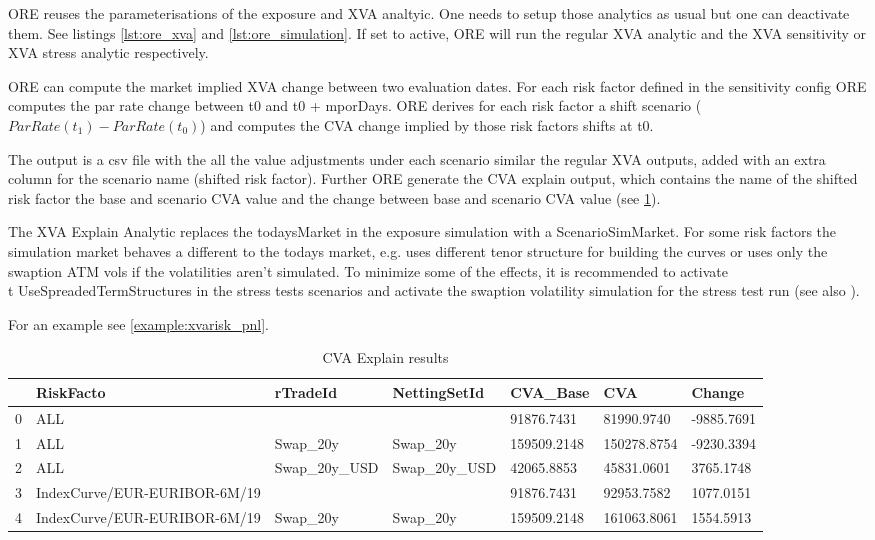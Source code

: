 ORE reuses the parameterisations of the exposure and XVA analtyic. One needs to setup those analytics as usual but one
can deactivate them. See listings \ref{lst:ore_xva} and \ref{lst:ore_simulation}. If set to active, ORE will run the
regular XVA analytic and the XVA sensitivity or XVA stress analytic respectively.

ORE can compute the market implied XVA change between two evaluation dates. For each risk factor defined in the sensitivity
config ORE computes the par rate change between t0 and t0 + mporDays.
ORE derives for each risk factor a shift scenario ($ParRate(t_1) - ParRate(t_0)$) and computes the CVA change implied by
those risk factors shifts at t0.

The output is a csv file with the all the value adjustments under each scenario similar the regular XVA outputs,
added with an extra column for the scenario name (shifted risk factor). Further ORE generate the CVA explain output,
which contains the name of the shifted risk factor the base and scenario CVA value and the change between base and
scenario CVA value (see \ref{table:cvaexplain}).

The XVA Explain Analytic replaces the todaysMarket in the exposure simulation with a ScenarioSimMarket.
For some risk factors the simulation market behaves a different to the todays market, e.g. uses different tenor structure
for building the curves or uses only the swaption ATM vols if the volatilities aren't simulated. To minimize some of
the effects, it is recommended to activate {\\t UseSpreadedTermStructures} in the stress tests scenarios
and activate the swaption volatility simulation for the stress test run (see also \cite{methods}).

For an example see \ref{example:xvarisk_pnl}.

\begin{table}
  \scriptsize
\begin{center}
\begin{tabular}{l|l|l|l|l|l|l}
\hline
 & RiskFacto&rTradeId&NettingSetId&CVA\_Base&CVA&Change \\
\hline
0 & ALL&&&91876.7431&81990.9740&-9885.7691 \\
1 & ALL&Swap\_20y&Swap\_20y&159509.2148&150278.8754&-9230.3394 \\
2 & ALL&Swap\_20y\_USD&Swap\_20y\_USD&42065.8853&45831.0601&3765.1748 \\
3 & IndexCurve/EUR-EURIBOR-6M/19&&&91876.7431&92953.7582&1077.0151 \\
4 & IndexCurve/EUR-EURIBOR-6M/19&Swap\_20y&Swap\_20y&159509.2148&161063.8061&1554.5913 \\
\hline
\end{tabular}
\caption{CVA Explain results}\label{table:cvaexplain}
\end{center}
\end{table}

